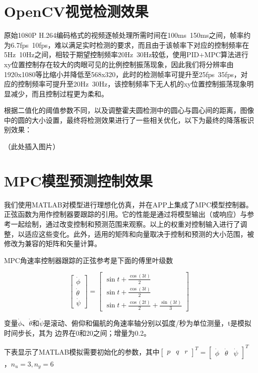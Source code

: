 \section{OpenCV视觉检测效果}

原始1080P H.264编码格式的视频逐帧处理所需时间在100ms~150ms之间，帧率约为6.7fps~10fps，难以满足实时检测的要求，而且由于该帧率下对应的控制频率在5Hz~10Hz之间，相较于期望控制频率20Hz~30Hz较低，使用PID+MPC算法进行xy位置控制存在较大的肉眼可见的比例控制振荡现象，因此我们将分辨率由1920x1080等比缩小并降低至568x320，此时的检测帧率可提升至25fps~35fps，对应的控制频率可提升至20Hz~30Hz，该控制频率下无人机的xy位置控制振荡现象明显减少，而且控制过程更为柔和。

根据二值化的阈值参数不同，以及调整霍夫圆检测中的圆心与圆心间的距离，图像中的圆的大小设置，最终将检测效果进行了一些相关优化，以下为最终的降落板识别效果：

（此处插入图片）

\section{MPC模型预测控制效果}

我们使用MATLAB对模型进行理想化仿真，并在APP上集成了MPC模型控制器。正弦函数为用作控制器要跟踪的引用。它的性能是通过将模型输出（或响应）与参考一起绘制，通过改变控制和预测范围来观察。以上的权重对控制输入进行了调整，以适应这些变化。此外，适用的矩阵和向量取决于控制和预测的大小范围，被修改为兼容的矩阵和矢量计算。

MPC角速率控制器跟踪的正弦参考是下面的傅里叶级数

$$
\left[\begin{array}{c}
\dot{\phi} \\
\dot{\theta} \\
\dot{\psi}
\end{array}\right]=\left[\begin{array}{c}
\sin t+\frac{\cos (3 t)}{2} \\
\sin t+\frac{\cos (3 t)}{2} \\
\sin t+\frac{\cos (2 t)}{2}+\frac{\sin (3 t)}{3}
\end{array}\right]
$$

变量$\dot{\phi}$、$\dot{\theta}$和$\dot{\psi}$是滚动、俯仰和偏航的角速率轴分别以弧度/秒为单位测量，t是模拟时间步长，其为
边界在0和20之间；增量为0.2。

下表显示了MATLAB模拟需要初始化的参数，其中$\left[\begin{array}{lll}p & q & r\end{array}\right]^{T}=\left[\begin{array}{lll}\dot{\phi} & \dot{\theta} & \dot{\psi}\end{array}\right]^{T}$，$n_{u}=3, n_{y}=6$

